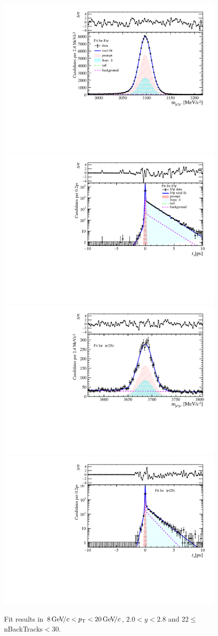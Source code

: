 \begin{figure}[H]
\begin{center}
\includegraphics[width=0.47\linewidth]{pdf/Jpsi/drawmassB/n4y1pt5.pdf}
\includegraphics[width=0.47\linewidth]{pdf/Jpsi/2DFitB/n4y1pt5.pdf}
\vspace*{-0.5cm}
\includegraphics[width=0.47\linewidth]{pdf/Psi2S/drawmassB/n4y1pt5.pdf}
\includegraphics[width=0.47\linewidth]{pdf/Psi2S/2DFitB/n4y1pt5.pdf}
\vspace*{-0.5cm}
\end{center}
\caption{Fit results in $8\text{\,Ge\kern -0.1em V\!/}c<p_{\mathrm{T}}<20\text{\,Ge\kern -0.1em V\!/}c$, $2.0<y<2.8$ and 22$\leq$nBackTracks$<$30.}
\label{Fitn4y1pt5}
\end{figure}
